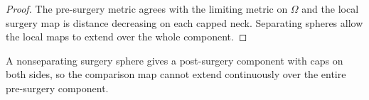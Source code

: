 \begin{proof}
\sketch
{}
The pre-surgery metric agrees with the limiting metric on $\Omega$ and the
local surgery map is distance decreasing on each capped neck. Separating
spheres allow the local maps to extend over the whole component.
\end{proof}

\begin{remark}
\label{rem:nonseparating-surgery-sphere}

A nonseparating surgery sphere gives a post-surgery component with caps on both
sides, so the comparison map cannot extend continuously over the entire
pre-surgery component.
\end{remark}
